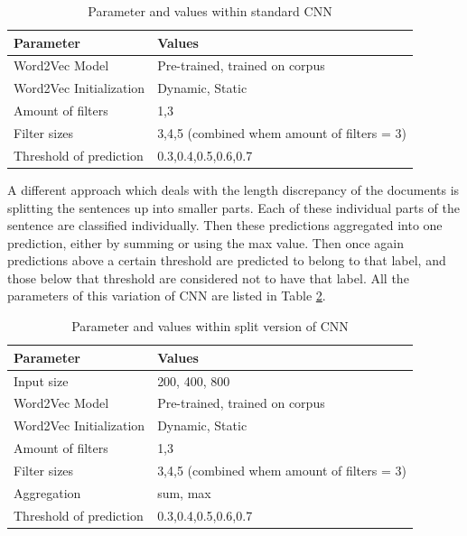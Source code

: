 \begin{table}[H]
\centering
\caption{Parameter and values within standard CNN}
\label{ParametersCNN}
\begin{tabular}{@{}ll@{}}
\toprule
\textbf{Parameter}      	& \textbf{Values}                             			\\ \midrule
Word2Vec Model          	& Pre-trained, trained on corpus              		\\
Word2Vec Initialization 	& Dynamic, Static                            			\\
Amount of filters       	& 1,3                                        				\\
Filter sizes           		& 3,4,5 (combined whem amount of filters = 3) 	\\
Threshold of prediction	& 0.3,0.4,0.5,0.6,0.7                         			\\ \bottomrule
\end{tabular}
\end{table}

A different approach which deals with the length discrepancy of the documents is splitting the sentences up into smaller parts. Each of these individual parts of the sentence are classified individually. Then these predictions aggregated into one prediction, either by summing or using the max value. Then once again predictions above a certain threshold are predicted to belong to that label, and those below that threshold are considered not to have that label. All the parameters of this variation of CNN are listed in Table \ref{ParametersCNNSplit}.

\begin{table}[H]
\centering
\caption{Parameter and values within split version of CNN}
\label{ParametersCNNSplit}
\begin{tabular}{@{}ll@{}}
\toprule
\textbf{Parameter}      	& \textbf{Values}                             			\\ \midrule
Input size              		& 200, 400, 800                               			\\
Word2Vec Model          	& Pre-trained, trained on corpus              		\\
Word2Vec Initialization 	& Dynamic, Static                             			\\
Amount of filters       	& 1,3                                         				\\
Filter sizes            		& 3,4,5 (combined whem amount of filters = 3) 	\\
Aggregation             	& sum, max                                    			\\
Threshold of prediction 	& 0.3,0.4,0.5,0.6,0.7                         			\\ \bottomrule
\end{tabular}
\end{table}

